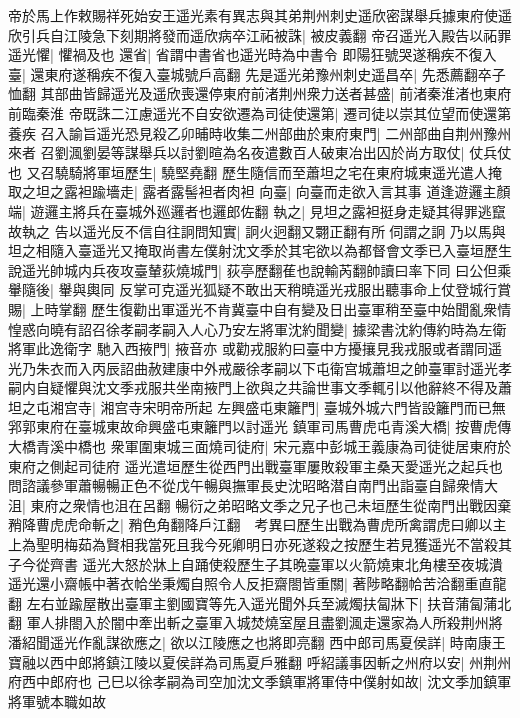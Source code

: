 帝於馬上作敕賜祥死始安王遥光素有異志與其弟荆州刺史遥欣密謀舉兵據東府使遥欣引兵自江陵急下刻期將發而遥欣病卒江祏被誅|{
	被皮義翻}
帝召遥光入殿告以祏罪遥光懼|{
	懼禍及也}
還省|{
	省謂中書省也遥光時為中書令}
即陽狂號哭遂稱疾不復入臺|{
	還東府遂稱疾不復入臺城號戶高翻}
先是遥光弟豫州刺史遥昌卒|{
	先悉薦翻卒子恤翻}
其部曲皆歸遥光及遥欣喪還停東府前渚荆州衆力送者甚盛|{
	前渚秦淮渚也東府前臨秦淮}
帝既誅二江慮遥光不自安欲遷為司徒使還第|{
	遷司徒以崇其位望而使還第養疾}
召入諭旨遥光恐見殺乙卯晡時收集二州部曲於東府東門|{
	二州部曲自荆州豫州來者}
召劉渢劉晏等謀舉兵以討劉暄為名夜遣數百人破東冶出囚於尚方取仗|{
	仗兵仗也}
又召驍騎將軍垣歷生|{
	驍堅堯翻}
歷生隨信而至蕭坦之宅在東府城東遥光遣人掩取之坦之露袒踰墻走|{
	露者露髻袒者肉袒}
向臺|{
	向臺而走欲入言其事}
道逢遊邏主顏端|{
	遊邏主將兵在臺城外廵邏者也邏郎佐翻}
執之|{
	見坦之露袒挺身走疑其得罪逃竄故執之}
告以遥光反不信自往詗問知實|{
	詗火迥翻又翾正翻有所伺謂之詗}
乃以馬與坦之相隨入臺遥光又掩取尚書左僕射沈文季於其宅欲以為都督會文季已入臺垣歷生說遥光帥城内兵夜攻臺輦荻燒城門|{
	荻亭歷翻萑也說輸芮翻帥讀曰率下同}
曰公但乘轝隨後|{
	轝與輿同}
反掌可克遥光狐疑不敢出天稍曉遥光戎服出聽事命上仗登城行賞賜|{
	上時掌翻}
歷生復勸出軍遥光不肯冀臺中自有變及日出臺軍稍至臺中始聞亂衆情惶惑向曉有詔召徐孝嗣孝嗣入人心乃安左將軍沈約聞變|{
	據梁書沈約傳約時為左衛將軍此逸衛字}
馳入西掖門|{
	掖音亦}
或勸戎服約曰臺中方擾攘見我戎服或者謂同遥光乃朱衣而入丙辰詔曲赦建康中外戒嚴徐孝嗣以下屯衛宫城蕭坦之帥臺軍討遥光孝嗣内自疑懼與沈文季戎服共坐南掖門上欲與之共論世事文季輒引以他辭終不得及蕭坦之屯湘宫寺|{
	湘宫寺宋明帝所起}
左興盛屯東籬門|{
	臺城外城六門皆設籬門而已無郛郭東府在臺城東故命興盛屯東籬門以討遥光}
鎮軍司馬曹虎屯青溪大橋|{
	按曹虎傳大橋青溪中橋也}
衆軍圍東城三面燒司徒府|{
	宋元嘉中彭城王義康為司徒徙居東府於東府之側起司徒府}
遥光遣垣歷生從西門出戰臺軍屢敗殺軍主桑天愛遥光之起兵也問諮議參軍蕭暢暢正色不從戊午暢與撫軍長史沈昭略潜自南門出詣臺自歸衆情大沮|{
	東府之衆情也沮在呂翻}
暢衍之弟昭略文季之兄子也己未垣歷生從南門出戰因棄矟降曹虎虎命斬之|{
	矟色角翻降戶江翻　考異曰歷生出戰為曹虎所禽謂虎曰卿以主上為聖明梅茹為賢相我當死且我今死卿明日亦死遂殺之按歷生若見獲遥光不當殺其子今從齊書}
遥光大怒於牀上自踊使殺歷生子其晩臺軍以火箭燒東北角樓至夜城潰遥光還小齋帳中著衣帢坐秉燭自照令人反拒齋閤皆重關|{
	著陟略翻帢苦洽翻重直龍翻}
左右並踰屋散出臺軍主劉國寶等先入遥光聞外兵至滅燭扶匐牀下|{
	扶音蒲匐蒲北翻}
軍人排閤入於闇中牽出斬之臺軍入城焚燒室屋且盡劉渢走還家為人所殺荆州將潘紹聞遥光作亂謀欲應之|{
	欲以江陵應之也將即亮翻}
西中郎司馬夏侯詳|{
	時南康王寶融以西中郎將鎮江陵以夏侯詳為司馬夏戶雅翻}
呼紹議事因斬之州府以安|{
	州荆州府西中郎府也}
己巳以徐孝嗣為司空加沈文季鎮軍將軍侍中僕射如故|{
	沈文季加鎮軍將軍號本職如故}
